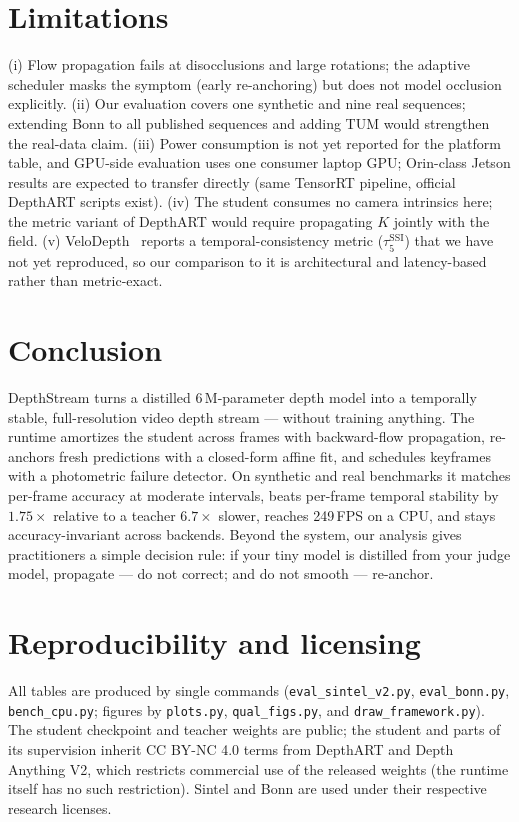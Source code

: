 \documentclass[10pt,twocolumn]{article}
\begin{document}
\section{Limitations}
\label{sec:limits}
(i) Flow propagation fails at disocclusions and large rotations; the adaptive
scheduler masks the symptom (early re-anchoring) but does not model
occlusion explicitly. (ii) Our evaluation covers one synthetic and nine real
sequences; extending Bonn to all published sequences and adding TUM would
strengthen the real-data claim. (iii) Power consumption is not yet reported
for the platform table, and GPU-side evaluation uses one consumer laptop GPU;
Orin-class Jetson results are expected to transfer directly (same TensorRT
pipeline, official DepthART scripts exist). (iv) The student consumes no
camera intrinsics here; the metric variant of DepthART would require
propagating $K$ jointly with the field. (v) VeloDepth~\cite{velodepth}
reports a temporal-consistency metric ($\tau^{\mathrm{SSI}}_5$) that we have
not yet reproduced, so our comparison to it is architectural and
latency-based rather than metric-exact.

\section{Conclusion}
DepthStream turns a distilled 6\,M-parameter depth model into a temporally
stable, full-resolution video depth stream --- without training anything.
The runtime amortizes the student across frames with backward-flow
propagation, re-anchors fresh predictions with a closed-form affine fit, and
schedules keyframes with a photometric failure detector. On synthetic and
real benchmarks it matches per-frame accuracy at moderate intervals, beats
per-frame temporal stability by $1.75\times$ relative to a teacher $6.7\times$
slower, reaches 249\,FPS on a CPU, and stays accuracy-invariant across
backends. Beyond the system, our analysis gives practitioners a simple
decision rule: if your tiny model is distilled from your judge model,
propagate --- do not correct; and do not smooth --- re-anchor.

\section*{Reproducibility and licensing}
All tables are produced by single commands
(\texttt{eval\_sintel\_v2.py}, \texttt{eval\_bonn.py}, \texttt{bench\_cpu.py};
figures by \texttt{plots.py}, \texttt{qual\_figs.py}, and
\texttt{draw\_framework.py}). The student checkpoint and teacher weights are
public; the student and parts of its supervision inherit CC BY-NC 4.0 terms
from DepthART and Depth Anything V2, which restricts commercial use of the
released weights (the runtime itself has no such restriction). Sintel and
Bonn are used under their respective research licenses.
\end{document}
